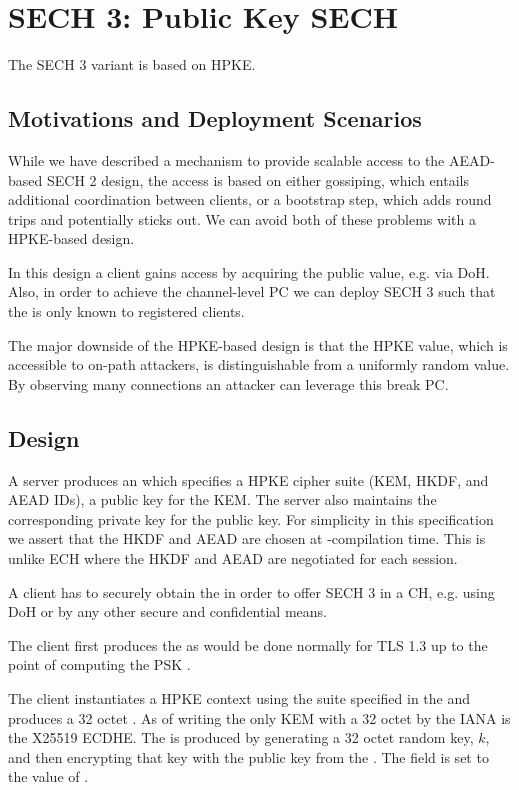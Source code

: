 \section{SECH 3: Public Key SECH}
The \ac{SECH} 3 variant is based on \ac{HPKE}.
\subsection{Motivations and Deployment Scenarios}

While we have described a mechanism to provide scalable access
to the \ac{AEAD}-based \ac{SECH} 2 design,
the access is based on either gossiping, which entails
additional coordination between clients, 
or a bootstrap step, which adds round trips and potentially sticks out.
We can avoid both of these problems with a \ac{HPKE}-based design.

In this design a client gains access by acquiring the public 
value, e.g. via \ac{DoH}.
Also, in order to achieve the channel-level \ac{PC}
we can deploy \ac{SECH} 3 such that the  is
only known to registered clients.

The major downside of the \ac{HPKE}-based design is that the
\ac{HPKE}  value,
which is accessible to on-path attackers,
is distinguishable from a uniformly random value.
By observing many connections an attacker can leverage
this break \ac{PC}.

\subsection{Design}

A server produces an  which specifies a \ac{HPKE} cipher suite
(\ac{KEM}, \ac{HKDF}, and \ac{AEAD} IDs),
a public key for the \ac{KEM}.
The server also maintains the corresponding private key for the public key.
For simplicity in this specification we assert that the \ac{HKDF}
and \ac{AEAD} are chosen at -compilation time.
This is unlike \ac{ECH} where the \ac{HKDF} and \ac{AEAD} are
negotiated for each session.

A client has to securely obtain the  in order to offer \ac{SECH} 3 in a \ac{CH}, e.g. using \ac{DoH} or by any other secure and confidential means.

The client first produces the  as would be done normally
for \ac{TLS} 1.3 up to the point of computing the \ac{PSK} .

The client instantiates a \ac{HPKE} context using the suite specified in
the  and produces a 32 octet .
As of writing the only \ac{KEM} with a 32 octet  by the \ac{IANA} is
the \ac{X25519} \ac{EC}\ac{DHE}.
The  is produced by generating a 32 octet random key, $k$, and then encrypting
that key with the public key from the .
The  field is set to the value of .

